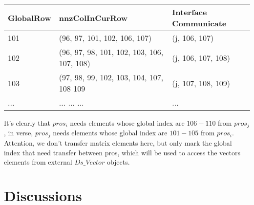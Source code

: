 \documentclass[11pt]{article}
\begin{document}
\begin{center}
	\begin{tabular}{|l |l |l |}
	\hline
	GlobalRow & nnzColInCurRow &   Interface Communicate \\ \hline
	101	&  (96, 97, 101, 102, 106, 107) & (j, 106, 107) \\ \hline
	102	&  (96, 97, 98, 101, 102, 103, 106, 107, 108) & (j, 106, 107, 108) \\ \hline
 	103	&  (97, 98, 99, 102, 103, 104, 107, 108 109 & (j, 107, 108, 109) \\ \hline
	...	& 	...	... 	...		&  ... \\
	\hline
	\end{tabular}
\end{center}

It's clearly that $pros_i$ needs elements whose global index are $106 - 110$ from $pros_j$ , in verse, $pros_j$ needs elements whose global index are $101 - 105$ from $pros_i$. Attention, we don't transfer matrix elements here, but only mark the global index that need transfer between pros, which will be used to access the vectors elements from external $Ds\_Vector$ objects.   
 
\section{Discussions}
\end{document}

